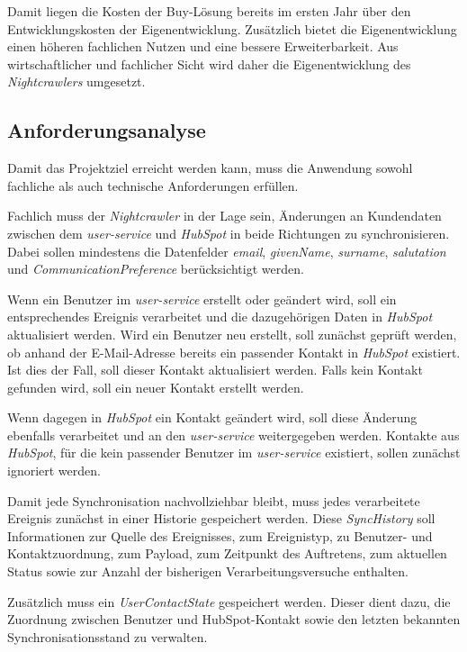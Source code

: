 Damit liegen die Kosten der Buy-Lösung bereits im ersten Jahr über den Entwicklungskosten der Eigenentwicklung.
Zusätzlich bietet die Eigenentwicklung einen höheren fachlichen Nutzen und eine bessere Erweiterbarkeit.
Aus wirtschaftlicher und fachlicher Sicht wird daher die Eigenentwicklung des \textit{Nightcrawlers} umgesetzt.


\subsection{Anforderungsanalyse}
\label{sec:Anforderungsanalyse}
Damit das Projektziel erreicht werden kann, muss die Anwendung sowohl fachliche als auch technische Anforderungen erfüllen.
\par\smallskip
Fachlich muss der \textit{Nightcrawler} in der Lage sein, Änderungen an Kundendaten zwischen dem \textit{user-service} und \textit{HubSpot} in beide Richtungen zu synchronisieren.
Dabei sollen mindestens die Datenfelder \textit{email}, \textit{givenName}, \textit{surname}, \textit{salutation} und \textit{CommunicationPreference} berücksichtigt werden.
\par\smallskip
Wenn ein Benutzer im \textit{user-service} erstellt oder geändert wird, soll ein entsprechendes Ereignis verarbeitet und die dazugehörigen Daten in \textit{HubSpot} aktualisiert werden.
Wird ein Benutzer neu erstellt, soll zunächst geprüft werden, ob anhand der E-Mail-Adresse bereits ein passender Kontakt in \textit{HubSpot} existiert.
Ist dies der Fall, soll dieser Kontakt aktualisiert werden.
Falls kein Kontakt gefunden wird, soll ein neuer Kontakt erstellt werden.
\par\smallskip
Wenn dagegen in \textit{HubSpot} ein Kontakt geändert wird, soll diese Änderung ebenfalls verarbeitet und an den \textit{user-service} weitergegeben werden.
Kontakte aus \textit{HubSpot}, für die kein passender Benutzer im \textit{user-service} existiert, sollen zunächst ignoriert werden.
\par\smallskip
Damit jede Synchronisation nachvollziehbar bleibt, muss jedes verarbeitete Ereignis zunächst in einer Historie gespeichert werden.
Diese \textit{SyncHistory} soll Informationen zur Quelle des Ereignisses, zum Ereignistyp, zu Benutzer- und Kontaktzuordnung,
zum Payload, zum Zeitpunkt des Auftretens, zum aktuellen Status sowie zur Anzahl der bisherigen Verarbeitungsversuche enthalten.
\par\smallskip
Zusätzlich muss ein \textit{UserContactState} gespeichert werden.
Dieser dient dazu, die Zuordnung zwischen Benutzer und HubSpot-Kontakt sowie den letzten bekannten Synchronisationsstand zu verwalten.
